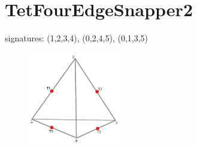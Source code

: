 \documentclass{article}
\begin{document}
\setcounter{subfigure}{0}
\clearpage



\section{TetFourEdgeSnapper2}

signatures:  (1,2,3,4), (0,2,4,5), (0,1,3,5)

\begin{figure}[h!]
\includegraphics[width=4cm]{TetFourEdgeSnapper2}
\end{figure}
\end{document}
